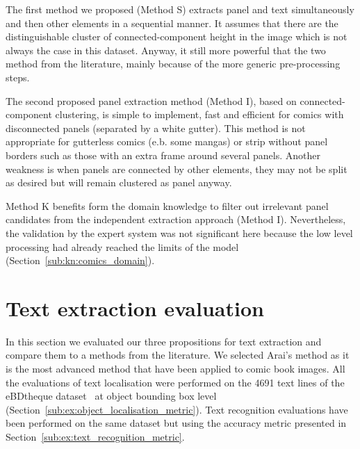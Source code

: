 The first method we proposed (Method S) extracts panel and text simultaneously and then other elements in a sequential manner.
It assumes that there are the distinguishable cluster of connected-component height in the image which is not always the case in this dataset.
Anyway, it still more powerful that the two method from the literature, mainly because of the more generic pre-processing steps.

The second proposed panel extraction method (Method I), based on connected-component clustering, is simple to implement, fast and efficient for comics with disconnected panels (separated by a white gutter).
This method is not appropriate for gutterless comics (e.b. some mangas) or strip without panel borders such as those with an extra frame around several panels.
Another weakness is when panels are connected by other elements, they may not be split as desired but will remain clustered as panel anyway.

Method K benefits form the domain knowledge to filter out irrelevant panel candidates from the independent extraction approach (Method I).
Nevertheless, the validation by the expert system was not significant here because the low level processing had already reached the limits of the model (Section~\ref{sub:kn:comics_domain}).






\section{Text extraction evaluation} %
\label{sub:ex:text_extraction_recognition_evaluation}

In this section we evaluated our three propositions for text extraction and compare them to a methods from the literature.
We selected Arai's method as it is the most advanced method that have been applied to comic book images.
All the evaluations of text localisation were performed on the 4691 text lines of the eBDtheque dataset~\cite{Guerin2013} at object bounding box level (Section~\ref{sub:ex:object_localisation_metric}).
Text recognition evaluations have been performed on the same dataset but using the accuracy metric presented in Section~\ref{sub:ex:text_recognition_metric}.

